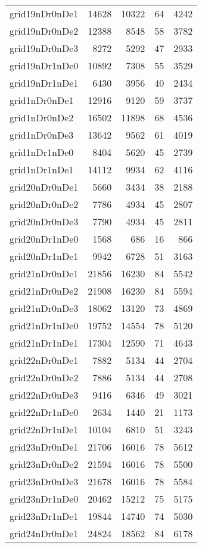 \begin{tabular}{lrrrr}
grid19nDr0nDe1 & 14628 & 10322 & 64 & 4242 \\
grid19nDr0nDe2 & 12388 & 8548 & 58 & 3782 \\
grid19nDr0nDe3 & 8272 & 5292 & 47 & 2933 \\
grid19nDr1nDe0 & 10892 & 7308 & 55 & 3529 \\
grid19nDr1nDe1 & 6430 & 3956 & 40 & 2434 \\
grid1nDr0nDe1 & 12916 & 9120 & 59 & 3737 \\
grid1nDr0nDe2 & 16502 & 11898 & 68 & 4536 \\
grid1nDr0nDe3 & 13642 & 9562 & 61 & 4019 \\
grid1nDr1nDe0 & 8404 & 5620 & 45 & 2739 \\
grid1nDr1nDe1 & 14112 & 9934 & 62 & 4116 \\
grid20nDr0nDe1 & 5660 & 3434 & 38 & 2188 \\
grid20nDr0nDe2 & 7786 & 4934 & 45 & 2807 \\
grid20nDr0nDe3 & 7790 & 4934 & 45 & 2811 \\
grid20nDr1nDe0 & 1568 & 686 & 16 & 866 \\
grid20nDr1nDe1 & 9942 & 6728 & 51 & 3163 \\
grid21nDr0nDe1 & 21856 & 16230 & 84 & 5542 \\
grid21nDr0nDe2 & 21908 & 16230 & 84 & 5594 \\
grid21nDr0nDe3 & 18062 & 13120 & 73 & 4869 \\
grid21nDr1nDe0 & 19752 & 14554 & 78 & 5120 \\
grid21nDr1nDe1 & 17304 & 12590 & 71 & 4643 \\
grid22nDr0nDe1 & 7882 & 5134 & 44 & 2704 \\
grid22nDr0nDe2 & 7886 & 5134 & 44 & 2708 \\
grid22nDr0nDe3 & 9416 & 6346 & 49 & 3021 \\
grid22nDr1nDe0 & 2634 & 1440 & 21 & 1173 \\
grid22nDr1nDe1 & 10104 & 6810 & 51 & 3243 \\
grid23nDr0nDe1 & 21706 & 16016 & 78 & 5612 \\
grid23nDr0nDe2 & 21594 & 16016 & 78 & 5500 \\
grid23nDr0nDe3 & 21678 & 16016 & 78 & 5584 \\
grid23nDr1nDe0 & 20462 & 15212 & 75 & 5175 \\
grid23nDr1nDe1 & 19844 & 14740 & 74 & 5030 \\
grid24nDr0nDe1 & 24824 & 18562 & 84 & 6178 \\

\end{tabular}
